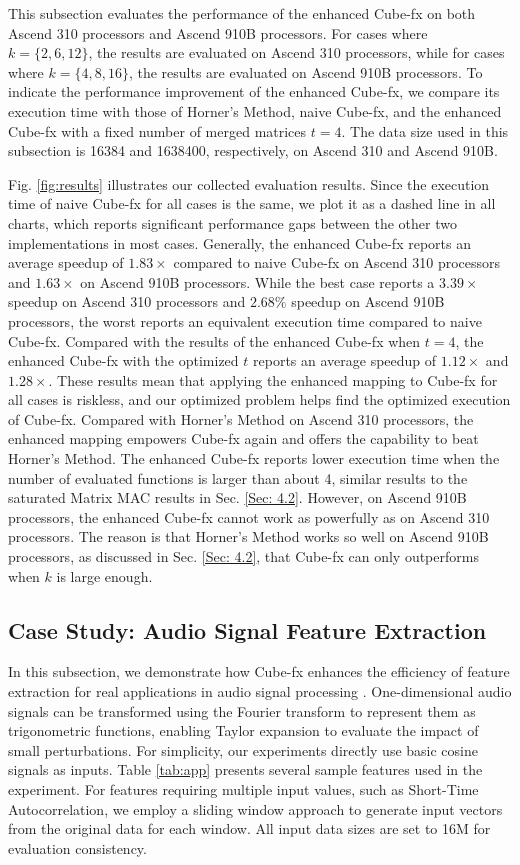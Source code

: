 This subsection evaluates the performance of the enhanced Cube-fx on both Ascend 310 processors and Ascend 910B processors. For cases where $k = \{2, 6, 12\}$, the results are evaluated on Ascend 310 processors, while for cases where $k = \{4, 8, 16\}$, the results are evaluated on Ascend 910B processors. To indicate the performance improvement of the enhanced Cube-fx, we compare its execution time with those of Horner's Method, naive Cube-fx, and the enhanced Cube-fx with a fixed number of merged matrices $t = 4$. The data size used in this subsection is 16384 and 1638400, respectively, on Ascend 310 and Ascend 910B. 

Fig. \ref{fig:results} illustrates our collected evaluation results. Since the execution time of naive Cube-fx for all cases is the same, we plot it as a dashed line in all charts, which reports significant performance gaps between the other two implementations in most cases. Generally, the enhanced Cube-fx reports an average speedup of $1.83\times$ compared to naive Cube-fx on Ascend 310 processors and $1.63\times$ on Ascend 910B processors. While the best case reports a $3.39\times$ speedup on Ascend 310 processors and $2.68\%$ speedup on Ascend 910B processors, the worst reports an equivalent execution time compared to naive Cube-fx. Compared with the results of the enhanced Cube-fx when $t = 4$, the enhanced Cube-fx with the optimized $t$ reports an average speedup of $1.12\times$ and $1.28\times$. These results mean that applying the enhanced mapping to Cube-fx for all cases is riskless, and our optimized problem helps find the optimized execution of Cube-fx. Compared with Horner's Method on Ascend 310 processors, the enhanced mapping empowers Cube-fx again and offers the capability to beat Horner's Method. The enhanced Cube-fx reports lower execution time when the number of evaluated functions is larger than about 4, similar results to the saturated Matrix MAC results in Sec. \ref{Sec: 4.2}. However, on Ascend 910B processors, the enhanced Cube-fx cannot work as powerfully as on Ascend 310 processors. The reason is that Horner's Method works so well on Ascend 910B processors, as discussed in Sec. \ref{Sec: 4.2}, that Cube-fx can only outperforms when $k$ is large enough.

\subsection{Case Study: Audio Signal Feature Extraction}

In this subsection, we demonstrate how Cube-fx enhances the efficiency of feature extraction for real applications in audio signal processing \cite{deller1993discrete}. One-dimensional audio signals can be transformed using the Fourier transform to represent them as trigonometric functions, enabling Taylor expansion to evaluate the impact of small perturbations. For simplicity, our experiments directly use basic cosine signals as inputs. Table \ref{tab:app} presents several sample features used in the experiment. For features requiring multiple input values, such as Short-Time Autocorrelation, we employ a sliding window approach to generate input vectors from the original data for each window. All input data sizes are set to 16M for evaluation consistency.

